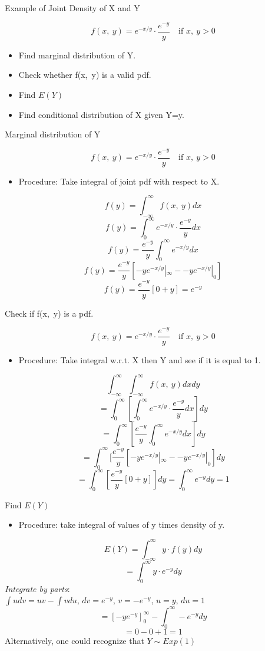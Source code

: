 \documentclass{beamer}
\numberwithin{equation}{section}
\begin{document}
\begin{frame}{Example of Joint Density of X and Y}

$$f(x,\ y)= e^{-x/y}\cdot \frac{e^{-y}}{y} \quad \text{if } x,\ y >0$$
\begin{itemize}
\item Find marginal distribution of Y.
\item Check whether f(x,\ y) is a valid pdf.
\item Find $E(Y)$
\item Find conditional distribution of X given Y=y.
\end{itemize}

\end{frame}
\begin{frame}{Marginal distribution of Y}

$$f(x,\ y)= e^{-x/y}\cdot \frac{e^{-y}}{y} \quad \text{if } x,\ y >0$$

\begin{itemize}
\item Procedure: Take integral of joint pdf with respect to X.
\end{itemize}
$$f(y)=\int_{-\infty}^\infty f(x,\ y) dx$$\pause
$$f(y)= \int_{0}^\infty e^{-x/y}\cdot \frac{e^{-y}}{y} dx$$\pause
$$f(y)= \frac{e^{-y}}{y}\int_{0}^\infty e^{-x/y}dx$$\pause
$$f(y)= \frac{e^{-y}}{y}  [-y e^{-x/y}|_\infty - -y e^{-x/y}|_0]$$\pause
$$f(y)= \frac{e^{-y}}{y}  [0 + y] =e^{-y}$$
\end{frame}


\begin{frame}{Check if f(x,\ y) is a pdf.}

$$f(x,\ y)= e^{-x/y}\cdot \frac{e^{-y}}{y} \quad \text{if } x,\ y >0$$

\begin{itemize}
\item Procedure: Take integral w.r.t. X then Y and see if it is equal to 1.
\end{itemize}
$$\int_{-\infty}^\infty \int_{-\infty}^\infty f(x,\ y) dxdy$$\pause
$$=\int_{0}^\infty[ \int_{0}^\infty e^{-x/y}\cdot \frac{e^{-y}}{y} dx]dy$$\pause
$$= \int_{0}^\infty[ \frac{e^{-y}}{y}\int_{0}^\infty e^{-x/y}dx]dy$$\pause
$$= \int_{0}^\infty[\frac{e^{-y}}{y}  [-y e^{-x/y}|_\infty - -y e^{-x/y}|_0]dy$$\pause
$$=\int_{0}^\infty[ \frac{e^{-y}}{y}  [0 + y]]dy =\int_{0}^\infty e^{-y}dy=1$$
\end{frame}



\begin{frame}{Find $E(Y)$}
\begin{itemize}
\item Procedure: take integral of values of y times density of y.
\end{itemize}
$$E(Y)=\int_{-\infty}^\infty y\cdot f(y) dy$$\pause
$$=\int_{0}^\infty y\cdot e^{-y} dy$$\pause
\emph{Integrate by parts}:\\ $\int u dv = uv-\int v du$, $dv= e^{-y}$, $v=-e^{-y}$, $u=y$, $du=1$\pause
$$=[-ye^{-y}]_0^\infty - \int_0^\infty -e^{-y}dy$$\pause
$$=0-0 +1=1$$\pause
Alternatively, one could recognize that $Y\sim Exp(1)$
\end{frame}
\end{document}
